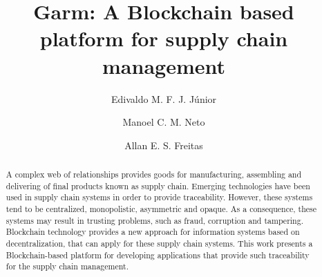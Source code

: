 \documentclass[sigconf]{acmart}
\begin{document}
\title{Garm: A Blockchain based platform for supply chain management}

\author{Edivaldo M. F. J. Júnior}

\author{Manoel C. M. Neto}

\author{Allan E. S. Freitas}


\begin{abstract}
  A complex web of relationships provides goods for manufacturing, assembling and delivering of final products known as supply chain. Emerging technologies have been used in supply chain systems in order to provide traceability. However, these systems tend to be centralized, monopolistic, asymmetric and opaque. As a consequence, these systems may result in trusting problems, such as fraud, corruption and tampering. Blockchain technology provides a new approach for information systems based on decentralization, that can apply for these supply chain systems. This work presents a Blockchain-based platform for developing applications that provide such traceability for the supply chain management. 
\end{abstract}
\end{document}
